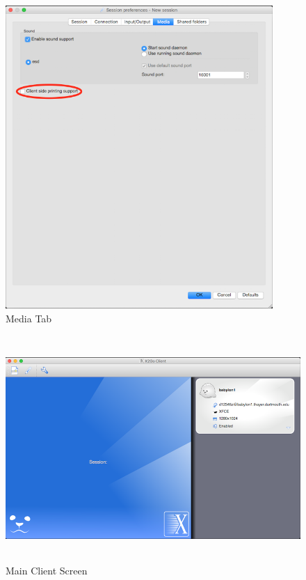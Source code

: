 \begin{figure}
	\centering
	\includegraphics[width=4.00394in,height=4.5315in]{src/images/image4.png}
	\caption{Media Tab}
	\label{fig:fig4}
\end{figure}
\begin{figure}
	\centering
	\includegraphics[width=5.50787in,height=3.38189in]{src/images/image5.png}
	\caption{Main Client Screen}
	\label{fig:fig5}
\end{figure}
